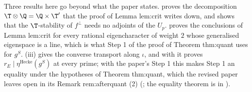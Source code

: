 Three results here go beyond what the paper states.  proves the decomposition $\T\otimes\Q=\Q\times\T'$ that the proof of Lemma lem:crit writes down, and shows
that the $\T$-stability of $f^\perp$ needs no adjoints of the $U_p$.  proves the conclusions of Lemma lem:crit for every rational eigencharacter of weight $2$ whose generalised eigenspace is a line,
which is what Step 1 of the proof of Theorem thm:quant uses for $g^S$. (iii) gives the converse transport along $\iota$, and with it
 proves $r_E\mid\eta^{\mathrm{Hecke}}(g^S)$ at every prime; with the paper's Step 1 this makes Step 1 an equality under the hypotheses of Theorem thm:quant,
which the revised paper leaves open in its Remark rem:afterquant (2) (; the equality theorem is in ).
